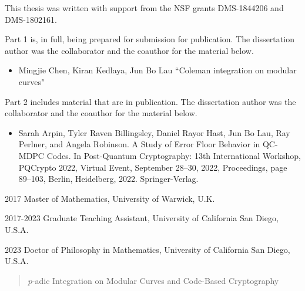 \begin{frontmatter}
\begin{acknowledgements}
This thesis was written with support from the NSF grants DMS-1844206 and DMS-1802161.

Part 1 is, in full, being prepared for submission for publication. The dissertation author was the collaborator and the coauthor for the material below.

\begin{itemize}
\item Mingjie Chen, Kiran Kedlaya, Jun Bo Lau ``Coleman integration on modular curves"
\end{itemize}

Part 2 includes material that are in publication. The dissertation author was the collaborator and the coauthor for the material below.

\begin{itemize}
\item Sarah Arpin, Tyler Raven Billingsley, Daniel Rayor Hast, Jun Bo Lau, Ray Perlner, and
 Angela Robinson. A Study of Error Floor Behavior in QC-MDPC Codes. In Post-Quantum
 Cryptography: 13th International Workshop, PQCrypto 2022, Virtual Event, September
 28–30, 2022, Proceedings, page 89–103, Berlin, Heidelberg, 2022.
 Springer-Verlag.
\end{itemize}

\end{acknowledgements}


%
%
\begin{vitapage}
\begin{vita}
  \item[2017] Master of Mathematics, University of Warwick, U.K.
  \item[2017-2023] Graduate Teaching Assistant, University of California San Diego, U.S.A.
  \item[2023] Doctor of Philosophy in Mathematics, University of California San Diego, U.S.A.
\end{vita}
\end{vitapage}


%
%
\begin{abstract}

\begin{center}
$p$-adic Integration on Modular Curves and Code-Based Cryptography

\vspace{8mm}


\end{center}
\end{abstract}
\end{frontmatter}
